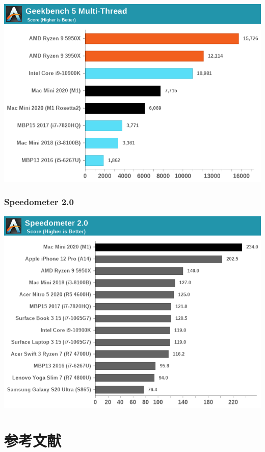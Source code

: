 \documentclass[a4paper]{article}
\begin{document}
\includegraphics[width=\textwidth]{Geekbench5-Multicore.png}

\subsubsection{Speedometer 2.0}

\includegraphics[width=\textwidth]{Speedometer2.0.png}

\newpage

\section{参考文献}
\cite{1}\cite{2}\cite{3}\cite{4}\cite{5}\cite{6}



\end{document}
